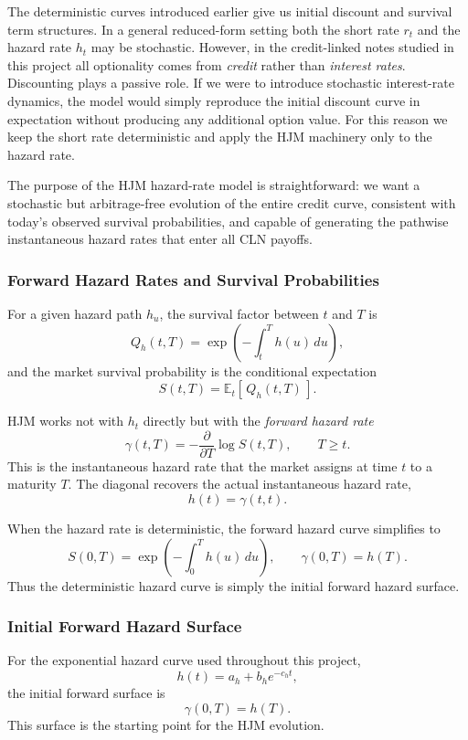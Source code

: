 The deterministic curves introduced earlier give us initial discount and
survival term structures. In a general reduced-form setting both the short rate
$r_t$ and the hazard rate $h_t$ may be stochastic. However, in the credit-linked
notes studied in this project all optionality comes from \emph{credit} rather
than \emph{interest rates}. Discounting plays a passive role. If we were to
introduce stochastic interest-rate dynamics, the model would simply reproduce
the initial discount curve in expectation without producing any additional
option value. For this reason we keep the short rate deterministic and apply the
HJM machinery only to the hazard rate.

The purpose of the HJM hazard-rate model is straightforward: we want a
stochastic but arbitrage-free evolution of the entire credit curve, consistent
with today’s observed survival probabilities, and capable of generating the
pathwise instantaneous hazard rates that enter all CLN payoffs.

\subsubsection*{Forward Hazard Rates and Survival Probabilities}

For a given hazard path $h_u$, the survival factor between $t$ and $T$ is
\[
Q_h(t,T) = \exp\!\left(-\int_t^T h(u)\,du\right),
\]
and the market survival probability is the conditional expectation
\[
S(t,T) = \mathbb{E}_t[\,Q_h(t,T)\,].
\]

HJM works not with $h_t$ directly but with the \emph{forward hazard rate}
\[
\gamma(t,T) = -\frac{\partial}{\partial T}\log S(t,T),
\qquad T \ge t.
\]
This is the instantaneous hazard rate that the market assigns at time $t$ to a
maturity $T$. The diagonal recovers the actual instantaneous hazard rate,
\[
h(t) = \gamma(t,t).
\]

When the hazard rate is deterministic, the forward hazard curve simplifies to
\[
S(0,T) = \exp\!\left(-\int_0^T h(u)\,du\right),
\qquad
\gamma(0,T) = h(T).
\]
Thus the deterministic hazard curve is simply the initial forward hazard
surface.

\subsubsection*{Initial Forward Hazard Surface}

For the exponential hazard curve used throughout this project,
\[
h(t) = a_h + b_h e^{-c_h t},
\]
the initial forward surface is
\[
\gamma(0,T) = h(T).
\]
This surface is the starting point for the HJM evolution.

